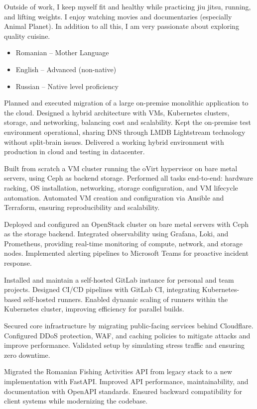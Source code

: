 \documentclass[10pt,a4paper,ragged2e,withhyper]{altacv}
\begin{document}
\begin{paracol}{2}
Outside of work, I keep myself fit and healthy while practicing jiu jitsu, running, and lifting weights. I enjoy watching movies and documentaries (especially Animal Planet). In addition to all this, I am very passionate about exploring quality cuisine.

{\small
\begin{itemize}
  \item Romanian – Mother Language
  \item English – Advanced (non-native)
  \item Russian – Native level proficiency
\end{itemize}
}


\end{paracol}
\newpage

Planned and executed migration of a large on-premise monolithic application to the cloud. Designed a hybrid architecture with VMs, Kubernetes clusters, storage, and networking, balancing cost and scalability. Kept the on-premise test environment operational, sharing DNS through LMDB Lightstream technology without split-brain issues. Delivered a working hybrid environment with production in cloud and testing in datacenter.
\divider

Built from scratch a VM cluster running the oVirt hypervisor on bare metal servers, using Ceph as backend storage. Performed all tasks end-to-end: hardware racking, OS installation, networking, storage configuration, and VM lifecycle automation. Automated VM creation and configuration via Ansible and Terraform, ensuring reproducibility and scalability.
\divider

Deployed and configured an OpenStack cluster on bare metal servers with Ceph as the storage backend. Integrated observability using Grafana, Loki, and Prometheus, providing real-time monitoring of compute, network, and storage nodes. Implemented alerting pipelines to Microsoft Teams for proactive incident response.
\divider

Installed and maintain a self-hosted GitLab instance for personal and team projects. Designed CI/CD pipelines with GitLab CI, integrating Kubernetes-based self-hosted runners. Enabled dynamic scaling of runners within the Kubernetes cluster, improving efficiency for parallel builds.
\divider

Secured core infrastructure by migrating public-facing services behind Cloudflare. Configured DDoS protection, WAF, and caching policies to mitigate attacks and improve performance. Validated setup by simulating stress traffic and ensuring zero downtime.
\divider


Migrated the Romanian Fishing Activities API from legacy stack to a new implementation with FastAPI. Improved API performance, maintainability, and documentation with OpenAPI standards. Ensured backward compatibility for client systems while modernizing the codebase.
\end{document}

